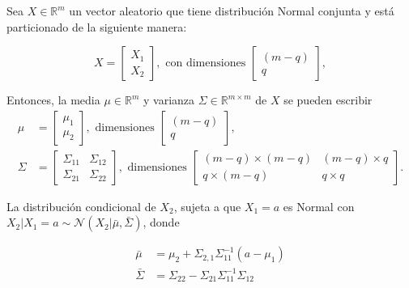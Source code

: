 \begin{prop}
    Sea $X \in \mathbb{R}^m$ un vector aleatorio que tiene distribuci\'on Normal conjunta y est\'a particionado de la siguiente manera:

    \begin{equation*}
        X = 
        \left[
        \begin{array}{c}
            X_1  \\
            X_2
        \end{array}
        \right], 
        \text{ con dimensiones }
            \left[
        \begin{array}{c}
            (m-q)  \\
            q
        \end{array}
        \right],
    \end{equation*}
    
    Entonces, la media $\mu \in \mathbb{R}^m$ y varianza $\Sigma \in \mathbb{R}^{m \times m}$ de $X$ se pueden escribir
    \begin{equation*}
    \begin{aligned}
        \mu &= 
        \left[
        \begin{array}{c}
            \mu_1  \\
            \mu_2
        \end{array}
        \right], 
        \text{ dimensiones }
            \left[
        \begin{array}{c}
            (m-q)  \\
            q
        \end{array}
        \right], \\
        \Sigma &= 
        \left[
        \begin{array}{cc}
            \Sigma_{11} & \Sigma_{12}  \\
            \Sigma_{21} & \Sigma_{22}
        \end{array}
        \right], 
        \text{ dimensiones }
            \left[
        \begin{array}{cc}
            (m-q) \times (m-q)  & (m-q) \times q  \\
            q \times (m-q) & q \times q
        \end{array}
        \right].
    \end{aligned}
    \end{equation*}
    
    La distribuci\'on condicional de $X_2$, sujeta a que $X_1 = a$ es Normal con $X_2|X_1=a \sim \mathcal{N}(X_2|\bar{\mu},\bar{\Sigma})$, donde
    
    \begin{equation*}
    \begin{aligned}
        \bar{\mu} &= \mu_2 + \Sigma_{2,1}\Sigma_{11}^{-1}(a-\mu_1) \\
        \bar{\Sigma} &= \Sigma_{22} - \Sigma_{21}\Sigma_{11}^{-1}\Sigma_{12}
    \end{aligned}
    \end{equation*}
\end{prop}

